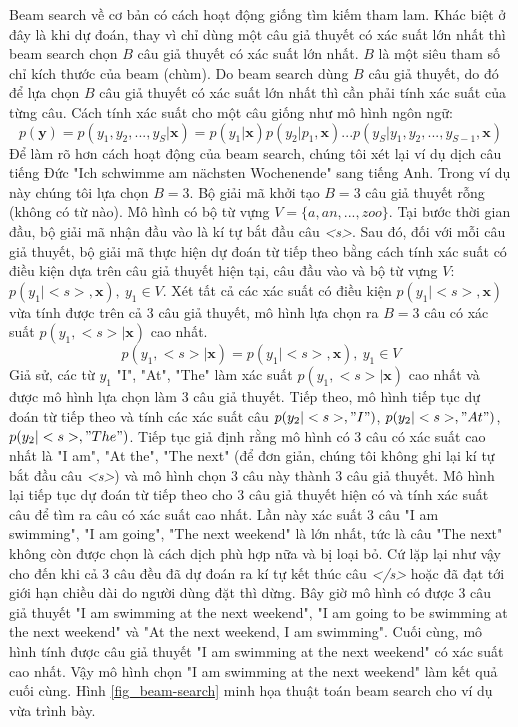 Beam search về cơ bản có cách hoạt động giống tìm kiếm tham lam. Khác biệt ở đây là khi dự đoán, thay vì chỉ dùng một câu giả thuyết có xác suất lớn nhất thì beam search chọn $B$ câu giả thuyết có xác suất lớn nhất. $B$ là một siêu tham số chỉ kích thước của beam (chùm). Do beam search dùng $B$ câu giả thuyết, do đó để lựa chọn $B$ câu giả thuyết có xác suất lớn nhất thì cần phải tính xác suất của từng câu. Cách tính xác suất cho một câu giống như mô hình ngôn ngữ:
\begin{equation}
p(\bm{y}) = p(y_1, y_2, ..., y_{S} | \bm{x}) = p(y_1 | \bm{x}) p(y_2 | p_1, \bm{x})...p(y_{S} | y_1, y_2, ...,y_{S-1}, \bm{x})
\end{equation}
Để làm rõ hơn cách hoạt động của beam search, chúng tôi xét lại ví dụ dịch câu tiếng Đức "Ich schwimme am nächsten Wochenende" sang tiếng Anh. Trong ví dụ này chúng tôi lựa chọn $B = 3$. Bộ giải mã khởi tạo $B = 3$ câu giả thuyết rỗng (không có từ nào). Mô hình có bộ từ vựng $V = \{a,an,...,zoo\}$. Tại bước thời gian đầu, bộ giải mã nhận đầu vào là kí tự bắt đầu câu \textit{<s>}. Sau đó, đối với mỗi câu giả thuyết, bộ giải mã thực hiện dự đoán từ tiếp theo bằng cách tính xác suất có điều kiện dựa trên câu giả thuyết hiện tại, câu đầu vào và bộ từ vựng $V$: $p(y_1 | <s>, \bm{x}), \ y_1 \in V$. Xét tất cả các xác suất có điều kiện $p(y_1 | <s>, \bm{x})$ vừa tính được trên cả 3 câu giả thuyết, mô hình lựa chọn ra $B = 3$ câu có xác suất $p(y_1, <s> | \bm{x})$ cao nhất.
\begin{equation*}
p(y_1, <s> | \bm{x}) = p(y_1 | <s>, \bm{x}),\ y_1 \in V
\end{equation*}
Giả sử, các từ $y_1$ "I", "At", "The" làm xác suất $p(y_1, <s> | \bm{x})$ cao nhất và được mô hình lựa chọn làm 3 câu giả thuyết. Tiếp theo, mô hình tiếp tục dự đoán từ tiếp theo và tính các xác suất câu $p(y_2 | <s>, "I")$, $p(y_2 | <s>, "At")$, $p(y_2 | <s>, "The")$. Tiếp tục giả định rằng mô hình có 3 câu có xác suất cao nhất là "I am", "At the", "The next" (để đơn giản, chúng tôi không ghi lại kí tự bắt đầu câu \textit{<s>}) và mô hình chọn 3 câu này thành 3 câu giả thuyết. Mô hình lại tiếp tục dự đoán từ tiếp theo cho 3 câu giả thuyết hiện có và tính xác suất câu để tìm ra câu có xác suất cao nhất. Lần này xác suất 3 câu "I am swimming", "I am going", "The next weekend" là lớn nhất, tức là câu "The next" không còn được chọn là cách dịch phù hợp nữa và bị loại bỏ. Cứ lặp lại như vậy cho đến khi cả 3 câu đều đã dự đoán ra kí tự kết thúc câu \textit{</s>} hoặc đã đạt tới giới hạn chiều dài do người dùng đặt thì dừng. Bây giờ mô hình có được 3 câu giả thuyết "I am swimming at the next weekend", "I am going to be swimming at the next weekend" và "At the next weekend, I am swimming". Cuối cùng, mô hình tính được câu giả thuyết "I am swimming at the next weekend" có xác suất cao nhất. Vậy mô hình chọn "I am swimming at the next weekend" làm kết quả cuối cùng. Hình \ref{fig_beam-search} minh họa thuật toán beam search cho ví dụ vừa trình bày.
